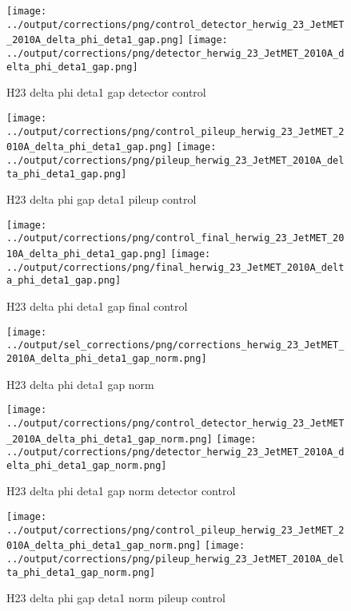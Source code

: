 \documentclass[11pt]{book}
\begin{document}
\begin{figure}[ht]
\centering
\texttt{[image: ../output/corrections/png/control\_detector\_herwig\_23\_JetMET\_2010A\_delta\_phi\_deta1\_gap.png]}
\texttt{[image: ../output/corrections/png/detector\_herwig\_23\_JetMET\_2010A\_delta\_phi\_deta1\_gap.png]}
\caption{H23 delta phi deta1 gap detector control}
\label{fig:H23_JetMET_2010A_delta_phi_deta1_gap_detector_control}
\end{figure}

\begin{figure}[ht]
\centering
\texttt{[image: ../output/corrections/png/control\_pileup\_herwig\_23\_JetMET\_2010A\_delta\_phi\_deta1\_gap.png]}
\texttt{[image: ../output/corrections/png/pileup\_herwig\_23\_JetMET\_2010A\_delta\_phi\_deta1\_gap.png]}
\caption{H23 delta phi gap deta1 pileup control}
\label{fig:H23_JetMET_2010A_delta_phi_deta1_gap_pileup_control}
\end{figure}


\begin{figure}[ht]
\centering
\texttt{[image: ../output/corrections/png/control\_final\_herwig\_23\_JetMET\_2010A\_delta\_phi\_deta1\_gap.png]}
\texttt{[image: ../output/corrections/png/final\_herwig\_23\_JetMET\_2010A\_delta\_phi\_deta1\_gap.png]}
\caption{H23 delta phi deta1 gap final control}
\label{fig:H23_JetMET_2010A_delta_phi_deta1_gap_final_control}
\end{figure}

\begin{figure}[ht]
\centering
\texttt{[image: ../output/sel\_corrections/png/corrections\_herwig\_23\_JetMET\_2010A\_delta\_phi\_deta1\_gap\_norm.png]}
\caption{H23 delta phi deta1 gap norm}
\label{fig:H23_JetMET_2010A_delta_phi_deta1_gap_norm}
\end{figure}

\begin{figure}[ht]
\centering
\texttt{[image: ../output/corrections/png/control\_detector\_herwig\_23\_JetMET\_2010A\_delta\_phi\_deta1\_gap\_norm.png]}
\texttt{[image: ../output/corrections/png/detector\_herwig\_23\_JetMET\_2010A\_delta\_phi\_deta1\_gap\_norm.png]}
\caption{H23 delta phi deta1 gap norm detector control}
\label{fig:H23_JetMET_2010A_delta_phi_deta1_gap_norm_detector_control}
\end{figure}

\begin{figure}[ht]
\centering
\texttt{[image: ../output/corrections/png/control\_pileup\_herwig\_23\_JetMET\_2010A\_delta\_phi\_deta1\_gap\_norm.png]}
\texttt{[image: ../output/corrections/png/pileup\_herwig\_23\_JetMET\_2010A\_delta\_phi\_deta1\_gap\_norm.png]}
\caption{H23 delta phi gap deta1 norm pileup control}
\label{fig:H23_JetMET_2010A_delta_phi_deta1_gap_norm_pileup_control}
\end{figure}
\end{document}
